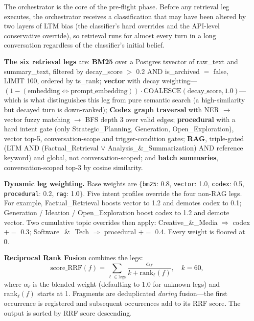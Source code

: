 \documentclass[11pt,a4paper]{article}
\begin{document}
The orchestrator is the core of the pre-flight phase. Before any retrieval leg executes, the orchestrator receives a classification that may have been altered by two layers of LTM bias (the classifier's hard overrides and the API-level conservative override), so retrieval runs for almost every turn in a long conversation regardless of the classifier's initial belief.

\textbf{The six retrieval legs} are: \textbf{BM25} over a Postgres tsvector of raw\_text and summary\_text, filtered by decay\_score $>$ 0.2 AND is\_archived $=$ false, LIMIT 100, ordered by ts\_rank; \textbf{vector} with decay weighting---$(1 - (\text{embedding} \Leftrightarrow \text{prompt\_embedding})) \cdot \text{COALESCE}(\text{decay\_score}, 1.0)$---which is what distinguishes this leg from pure semantic search (a high-similarity but decayed turn is down-ranked); \textbf{Codex graph traversal} with NER $\rightarrow$ vector fuzzy matching $\rightarrow$ BFS depth 3 over valid edges; \textbf{procedural} with a hard intent gate (only Strategic\_Planning, Generation, Open\_Exploration), vector top-5, conversation-scope and trigger-condition gates; \textbf{RAG}, triple-gated (LTM AND (Factual\_Retrieval $\lor$ Analysis\_\&\_Summarization) AND reference keyword) and global, not conversation-scoped; and \textbf{batch summaries}, conversation-scoped top-3 by cosine similarity.

\textbf{Dynamic leg weighting.} Base weights are $\{$\texttt{bm25}: 0.8, \texttt{vector}: 1.0, \texttt{codex}: 0.5, \texttt{procedural}: 0.2, \texttt{rag}: 1.0$\}$. Five intent profiles override the four non-RAG legs. For example, Factual\_Retrieval boosts vector to 1.2 and demotes codex to 0.1; Generation / Ideation / Open\_Exploration boost codex to 1.2 and demote vector. Two cumulative topic overrides then apply: Creative\_\&\_Media $\Rightarrow$ codex $+=$ 0.3; Software\_\&\_Tech $\Rightarrow$ procedural $+=$ 0.4. Every weight is floored at 0.

\textbf{Reciprocal Rank Fusion} combines the legs:
\begin{equation}
\mathrm{score\_RRF}(f) = \sum_{\ell \in \mathrm{legs}} \frac{\alpha_\ell}{k + \mathrm{rank}_\ell(f)}, \quad k = 60,
\end{equation}
where $\alpha_\ell$ is the blended weight (defaulting to 1.0 for unknown legs) and $\mathrm{rank}_\ell(f)$ starts at 1. Fragments are deduplicated \emph{during} fusion---the first occurrence is registered and subsequent occurrences add to its RRF score. The output is sorted by RRF score descending.
\end{document}
